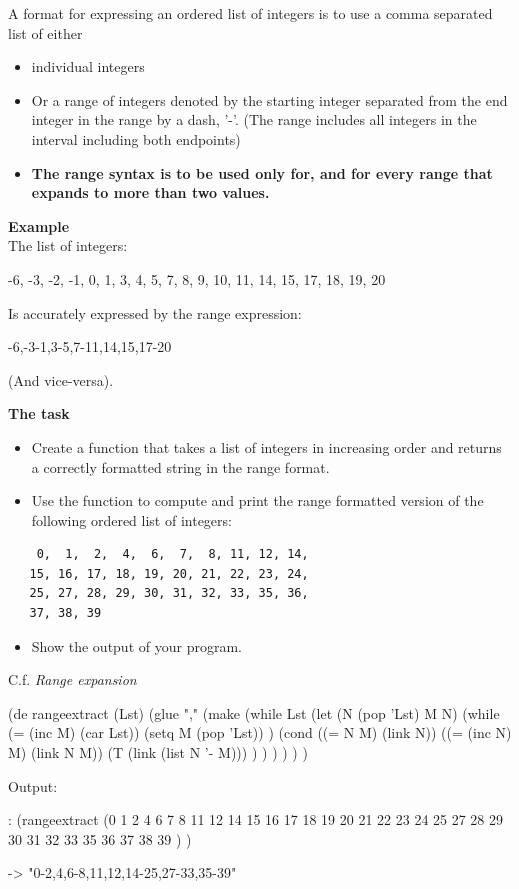 A format for expressing an ordered list of integers is to use a comma
separated list of either

\begin{itemize}
\item
  individual integers
\item
  Or a range of integers denoted by the starting integer separated from
  the end integer in the range by a dash, '-'. (The range includes all
  integers in the interval including both endpoints)
\end{itemize}

\begin{itemize}
\item
  \textbf{The range syntax is to be used only for, and for every range
  that expands to more than two values.}
\end{itemize}

\textbf{Example}\\ The list of integers:

-6, -3, -2, -1, 0, 1, 3, 4, 5, 7, 8, 9, 10, 11, 14, 15, 17, 18, 19, 20

Is accurately expressed by the range expression:

-6,-3-1,3-5,7-11,14,15,17-20

(And vice-versa).

\textbf{The task}

\begin{itemize}
\item
  Create a function that takes a list of integers in increasing order
  and returns a correctly formatted string in the range format.
\item
  Use the function to compute and print the range formatted version of
  the following ordered list of integers:
\end{itemize}

\begin{verbatim}
    0,  1,  2,  4,  6,  7,  8, 11, 12, 14,
   15, 16, 17, 18, 19, 20, 21, 22, 23, 24,
   25, 27, 28, 29, 30, 31, 32, 33, 35, 36,
   37, 38, 39
\end{verbatim}

\begin{itemize}
\item
  Show the output of your program.
\end{itemize}

C.f. \emph{Range expansion}


\begin{wideverbatim}

(de rangeextract (Lst)
   (glue ","
      (make
         (while Lst
            (let (N (pop 'Lst)  M N)
               (while (= (inc M) (car Lst))
                  (setq M (pop 'Lst)) )
               (cond
                  ((= N M) (link N))
                  ((= (inc N) M) (link N M))
                  (T (link (list N '- M))) ) ) ) ) ) )

Output:

: (rangeextract
   (0 1 2 4 6 7 8 11 12 14 15 16 17 18 19 20 21 22
      23 24 25 27 28 29 30 31 32 33 35 36 37 38 39 ) )

-> "0-2,4,6-8,11,12,14-25,27-33,35-39"

\end{wideverbatim}

